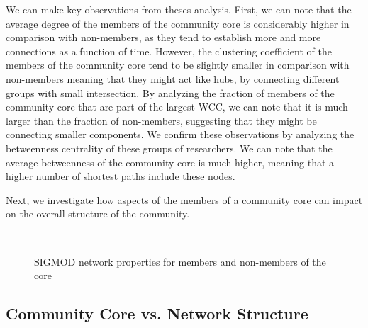 We can make key observations
from theses analysis. First, we can note that the average degree of the members of the community core is considerably higher in comparison with non-members, as they tend to establish more and
more connections as a function of time. However, the clustering coefficient of the members of the community core tend to be slightly smaller in comparison with non-members meaning that they
might act like hubs, by connecting different groups with small intersection. By analyzing the fraction of members of the community core that are part of the largest
WCC, we can note that it is much larger than the fraction of non-members, suggesting that they might be connecting smaller components. 
We confirm these observations by analyzing the betweenness centrality of these groups of researchers. We can note that the average betweenness of the community core is much higher,
meaning that a higher number of shortest paths include these nodes. 

Next, we investigate how aspects of the members of a community core can impact on the overall structure of the community.


\begin{figure}[!htpb]
  \begin{center}
  \\
  \end{center}
  \vspace{-0.5cm}
  \caption{SIGMOD network properties for members and non-members of the core}
  \label{fig:metrics_comparing_core_community}
\end{figure}



\subsection{Community Core vs. Network Structure}
\label{sub:corr}

